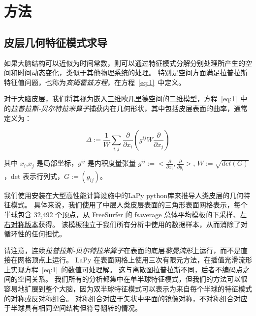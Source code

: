 \documentclass[lang=cn,a4paper,newtx,citestyle=gb7714-2015, bibstyle=gb7714-2015]{elegantpaper}
\begin{document}
\section{方法} \label{sec:method}

\subsection{皮层几何特征模式求导} \label{sec:derivation}

如果大脑结构可以近似为时间常数，则可以通过特征模式分解\cite{nowack1995neocortical,robinson2016eigenmodes}分别处理所产生的空间和时间动态变化，类似于其他物理系统的处理\cite{melrose1991electromagnetic}。
特别是空间方面满足拉普拉斯特征值问题，也称为\textit{亥姆霍兹方程}，在方程~\ref{eq:1}~中定义。


对于大脑皮层，我们将其视为嵌入三维欧几里德空间的二维模型，方程~\ref{eq:1}~中的\textit{拉普拉斯-贝尔特拉米算子}捕获内在几何形状，其中包括皮层表面的曲率\cite{wachinger2015brainprint}，通常定义为\cite{chavel1984eigenvalues,seo2011laplace}：


\begin{equation}\label{eq:surface_curvature}
	\Delta:=\frac{1}{W} \sum_{i,j} \frac{\partial}{\partial x_i} (g^{ij} W \frac{\partial}{\partial x_j})
\end{equation}

其中 $ x_i $,$ x_j $ 是局部坐标，$ g^{ij} $ 是内积度量张量 $ g^{ij}:=<\frac{\partial}{\partial x_i}, \frac{\partial}{\partial y_i}> $, $ W:=\sqrt{det(G)} $，det 表示行列式，$ G:=(g_{ij}) $。


我们使用安装在大型高性能计算设施\cite{goscinski2014multi}中的LaPy python库\cite{wachinger2015brainprint,reuter2006laplace}来推导人类皮层的几何特征模式。 
具体来说，我们使用了中层人类皮层表面的三角形表面网格表示，每个半球包含 32,492 个顶点，从 FreeSurfer 的 fsaverage 总体平均模板的下采样、\href{https://github.com/ThomasYeoLab/CBIG/tree/master/data/templates/surface/fs_LR_32k}{左右对称版本}获得\cite{fischl1999high}。
该模板独立于我们所有分析中使用的数据样本，从而消除了对循环性的任何担忧。


请注意，连续\textit{拉普拉斯-贝尔特拉米算子}在表面的底层\textit{黎曼流形}上运行，而不是直接在网格顶点上运行。
LaPy 在表面网格上使用三次有限元方法，在插值光滑流形上实现方程~\ref{eq:1}~的数值可处理解。
这与离散图拉普拉斯\cite{shuman2013emerging}不同，后者不编码点之间的空间关系。
我们所有的分析都集中在单半球特征模式，但我们的方法可以很容易地扩展到整个大脑，因为双半球特征模式可以表示为来自每个半球的特征模式的对称或反对称组合。
对称组合对应于矢状中平面的镜像对称，不对称组合对应于半球具有相同空间结构但符号翻转的情况。
\end{document}
